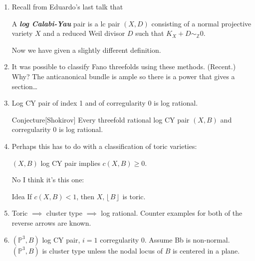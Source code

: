 \begin{enumerate}
\item Recall from Eduardo's last talk that

\begin{defn}
	A \textit{\textbf{log Calabi-Yau}} pair is a lc pair  $(X,D)$ consisting of a normal projective variety $X$ and a reduced Weil divisor $D$ such that $K_X+D\sim_{\mathbb{Z}}0$.
\end{defn}

Now we have given a slightly different definition.

\item  It was possible to classify Fano threefolds using these methods. (Recent.) Why? The anticanonical bundle is ample so there is a power that gives a section…
\item 
	\begin{thm}\leavevmode
	Log CY pair of index 1 and of corregularity 0 is log rational.
	\end{thm}
	\begin{thing5}{Conjecture}[Shokirov]\leavevmode
	Every threefold rational log CY pair \((X,B )\) and corregularity 0 is log rational.
	\end{thing5}
\item  Perhaps this has to do with a classification of toric varieties:
	\begin{thm}\leavevmode
	\((X,B)\) log CY pair implies \(c (X,B ) \geq 0\).
	\end{thm}
No I think it's this one:
\begin{thing5}{Idea}\leavevmode
If \(c(X,B)<1\), then \(X,\left\lfloor B \right\rfloor\) is toric.
\end{thing5}
\item Toric \(\implies \) cluster type \(\implies \) log rational. Counter examples for both of the reverse arrows are known.
\item 
	\begin{thm}\leavevmode
	\((\mathbb{P}^3,B)\) log CY pair, \(i=1\) corregularity 0. Assume Bb is non-normal. \((\mathbb{P}^3, B )\) is cluster type unless the nodal locus of  \(B\) is centered in a plane.
	\end{thm}
\end{enumerate}

